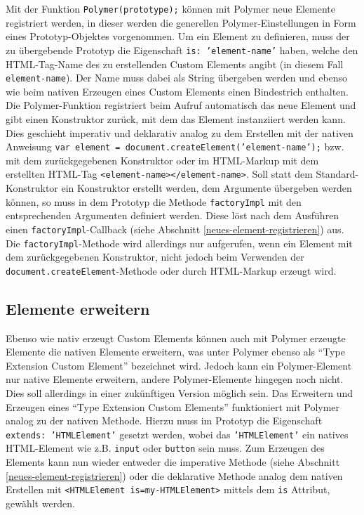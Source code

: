 Mit der Funktion \texttt{Polymer(pro\-to\-type);} können mit Polymer neue Elemente registriert werden, in dieser werden die generellen Polymer-Einstellungen in Form eines Prototyp-Objektes vorgenommen. Um ein Element zu definieren, muss der zu übergebende Prototyp die Eigenschaft \texttt{is: 'element-name'} haben, welche den \ac{HTML}-Tag-Name des zu erstellenden Custom Elements angibt (in diesem Fall \texttt{element-name}). Der Name muss dabei als String übergeben werden und ebenso wie beim nativen Erzeugen eines Custom Elements einen Bindestrich enthalten. Die Polymer-Funktion registriert beim Aufruf automatisch das neue Element und gibt einen Konstruktor zurück, mit dem das Element instanziiert werden kann. Dies geschieht imperativ und deklarativ analog zu dem Erstellen mit der nativen Anweisung \texttt{var\ element\ =\ document.createElement('element-name');} bzw. mit dem zurückgegebenen Konstruktor oder im \ac{HTML}-Markup mit dem erstellten \ac{HTML}-Tag \texttt{\textless{}element-name\textgreater{}\textless{}/element-name\textgreater{}}. Soll statt dem Standard-Konstruktor ein Konstruktor erstellt werden, dem Argumente übergeben werden können, so muss in dem Prototyp die Methode \texttt{factoryImpl} mit den entsprechenden Argumenten definiert werden. Diese löst nach dem Ausführen einen \texttt{factoryImpl}-Callback (siehe Abschnitt \ref{neues-element-registrieren}) aus. Die \texttt{factoryImpl}-Methode wird allerdings nur aufgerufen, wenn ein Element mit dem zurückgegebenen Konstruktor, nicht jedoch beim Verwenden der \texttt{document.createElement}-Methode oder durch \ac{HTML}-Markup erzeugt wird.


\subsection{Elemente erweitern}\label{elemente-erweitern}

Ebenso wie nativ erzeugt Custom Elements können auch mit Polymer erzeugte Elemente die nativen Elemente erweitern, was unter Polymer ebenso als ``Type Extension Custom Element'' bezeichnet wird. Jedoch kann ein Polymer-Element nur native Elemente erweitern, andere Polymer-Elemente hingegen noch nicht. Dies soll allerdings in einer zukünftigen Version möglich sein. Das Erweitern und Erzeugen eines ``Type Extension Custom Elements'' funktioniert mit Polymer analog zu der nativen Methode. Hierzu muss im Prototyp die Eigenschaft \texttt{extends:\ '\ac{HTML}Element'} gesetzt werden, wobei das \texttt{'\ac{HTML}Element'} ein natives \ac{HTML}-Element wie z.B. \texttt{input} oder \texttt{button} sein muss. Zum Erzeugen des Elements kann nun wieder entweder die imperative Methode (siehe Abschnitt \ref{neues-element-registrieren}) oder die deklarative Methode analog dem nativen Erstellen mit \texttt{\textless{}\ac{HTML}Element\ is=\dq my-\ac{HTML}Element\dq\textgreater{}} mittels dem \texttt{is} Attribut, gewählt werden.


